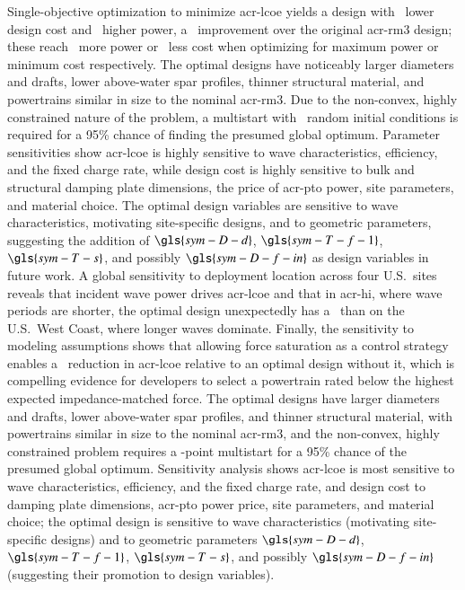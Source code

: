 Single-objective optimization to minimize \gls{acr-lcoe} yields a design with \resultsRE[pctImproveDesignCostMinLCOE]~lower design cost and \resultsRE[pctImprovePowerMinLCOE]~higher power, a \resultsRE[pctImproveLCOEMinLCOE]~improvement over the original \gls{acr-rm3} design; these reach \resultsRE[pctImprovePowerMaxPower]~more power or \resultsRE[pctImproveDesignCostMinCapex]~less cost when optimizing for maximum power or minimum cost respectively.
\ifdefined\DISSERTATION
    The optimal designs have noticeably larger diameters and drafts, lower above-water spar profiles, thinner structural material, and powertrains similar in size to the nominal \gls{acr-rm3}.
    Due to the non-convex, highly constrained nature of the problem, a multistart with \resultsRE[numMultistartRequired]~random initial conditions is required for a 95\% chance of finding the presumed global optimum.
    Parameter sensitivities show \gls{acr-lcoe} is highly sensitive to wave characteristics, efficiency, and the fixed charge rate, while design cost is highly sensitive to bulk and structural damping plate dimensions, the price of \gls{acr-pto} power, site parameters, and material choice.
    The optimal design variables are sensitive to wave characteristics, motivating site-specific designs, and to geometric parameters, suggesting the addition of $\gls{sym-D-d}$, $\gls{sym-T-f-1}$, $\gls{sym-T-s}$, and possibly $\gls{sym-D-f-in}$ as design variables in future work.
    A global sensitivity to deployment location across four U.S.\ sites reveals that incident wave power drives \gls{acr-lcoe} and that in \gls{acr-hi}, where wave periods are shorter, the optimal design unexpectedly has a \resultsRE[HawaiiDesignCharacteristics]~than on the U.S.\ West Coast, where longer waves dominate.
    Finally, the sensitivity to modeling assumptions shows that allowing force saturation as a control strategy enables a \resultsRE[pctLCOEIncreaseForceSatOptMinLCOE]~reduction in \gls{acr-lcoe} relative to an optimal design without it, which is compelling evidence for developers to select a powertrain rated below the highest expected impedance-matched force.
\else
    The optimal designs have larger diameters and drafts, lower above-water spar profiles, and thinner structural material, with powertrains similar in size to the nominal \gls{acr-rm3}, and the non-convex, highly constrained problem requires a \resultsRE[numMultistartRequired]-point multistart for a 95\% chance of the presumed global optimum.
    Sensitivity analysis shows \gls{acr-lcoe} is most sensitive to wave characteristics, efficiency, and the fixed charge rate, and design cost to damping plate dimensions, \gls{acr-pto} power price, site parameters, and material choice; the optimal design is sensitive to wave characteristics (motivating site-specific designs) and to geometric parameters $\gls{sym-D-d}$, $\gls{sym-T-f-1}$, $\gls{sym-T-s}$, and possibly $\gls{sym-D-f-in}$ (suggesting their promotion to design variables).
